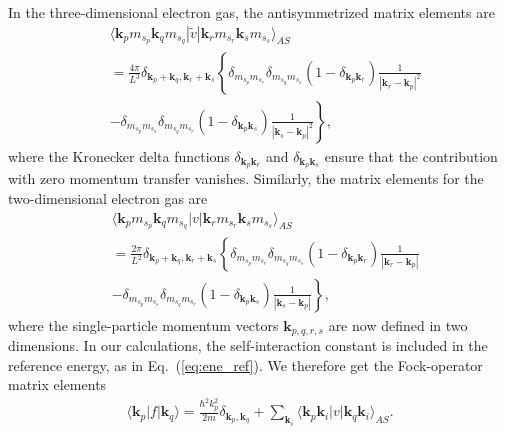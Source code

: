\documentclass[aps,twocolumn,showpacs,floatfix,nofootinbib,preprintnumbers,superscriptaddress,amsmath,amssymb]{revtex4-1}
\begin{document}
In the three-dimensional electron gas, the antisymmetrized
matrix elements are
\begin{align} \label{eq:vmat_3dheg}
  & \langle \mathbf{k}_{p}m_{s_{p}}\mathbf{k}_{q}m_{s_{q}}
  |\tilde{v}|\mathbf{k}_{r}m_{s_{r}}\mathbf{k}_{s}m_{s_{s}}\rangle_{AS} 
  \nonumber \\
  & = \frac{4\pi }{L^{3}}\delta_{\mathbf{k}_{p}+\mathbf{k}_{q},
    \mathbf{k}_{r}+\mathbf{k}_{s}}\left\{ 
  \delta_{m_{s_{p}}m_{s_{r}}}\delta_{m_{s_{q}}m_{s_{s}}}
  \left( 1 - \delta_{\mathbf{k}_{p}\mathbf{k}_{r}}\right) 
  \frac{1}{|\mathbf{k}_{r}-\mathbf{k}_{p}|^{2}}
  \right. \nonumber \\
  & \left. - \delta_{m_{s_{p}}m_{s_{s}}}\delta_{m_{s_{q}}m_{s_{r}}}
  \left( 1 - \delta_{\mathbf{k}_{p}\mathbf{k}_{s}} \right)
  \frac{1}{|\mathbf{k}_{s}-\mathbf{k}_{p}|^{2}} 
  \right\} ,
\end{align}
where the Kronecker delta functions 
$\delta_{\mathbf{k}_{p}\mathbf{k}_{r}}$ and
$\delta_{\mathbf{k}_{p}\mathbf{k}_{s}}$ ensure that the 
contribution with zero momentum transfer vanishes.
Similarly, the matrix elements for the two-dimensional
electron gas are
\begin{align} \label{eq:vmat_2dheg}
  & \langle \mathbf{k}_{p}m_{s_{p}}\mathbf{k}_{q}m_{s_{q}}
  |v|\mathbf{k}_{r}m_{s_{r}}\mathbf{k}_{s}m_{s_{s}}\rangle_{AS} 
  \nonumber \\
  & = \frac{2\pi }{L^{2}}
  \delta_{\mathbf{k}_{p}+\mathbf{k}_{q},\mathbf{k}_{r}+\mathbf{k}_{s}}
  \left\{ \delta_{m_{s_{p}}m_{s_{r}}}\delta_{m_{s_{q}}m_{s_{s}}} 
  \left( 1 - \delta_{\mathbf{k}_{p}\mathbf{k}_{r}}\right)
  \frac{1}{
    |\mathbf{k}_{r}-\mathbf{k}_{p}|} \right.
  \nonumber \\
  & - \left. \delta_{m_{s_{p}}m_{s_{s}}}\delta_{m_{s_{q}}m_{s_{r}}}
  \left( 1 - \delta_{\mathbf{k}_{p}\mathbf{k}_{s}}\right)
  \frac{1}{ 
    |\mathbf{k}_{s}-\mathbf{k}_{p}|}
  \right\} ,
\end{align}
where the single-particle momentum vectors $\mathbf{k}_{p,q,r,s}$
are now defined in two dimensions. In our calculations, the 
self-interaction constant is included in the reference 
energy, as in Eq.~(\ref{eq:ene_ref}). We therefore get the 
Fock-operator matrix elements 
\begin{align}
  \langle \mathbf{k}_{p}|f|\mathbf{k}_{q} \rangle
  = \frac{\hbar^{2}k_{p}^{2}}{2m}\delta_{\mathbf{k}_{p},
  \mathbf{k}_{q}} + \sum_{\mathbf{k}_{i}}\langle 
  \mathbf{k}_{p}\mathbf{k}_{i}|v|\mathbf{k}_{q}
  \mathbf{k}_{i}\rangle_{AS}.
  \label{eq:fock_heg}
\end{align}
\end{document}
